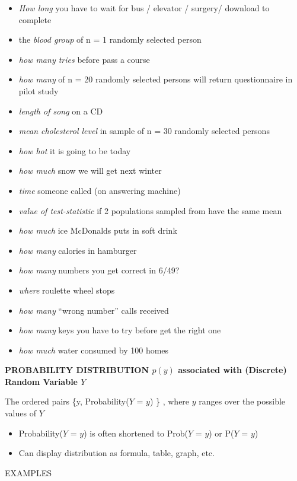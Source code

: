 \documentclass[]{book}
\providecommand{\tightlist}{%
  \setlength{\itemsep}{0pt}\setlength{\parskip}{0pt}}
\begin{document}
\begin{itemize}
\tightlist
\item
  \emph{How long} you have to wait for bus / elevator / surgery/ download to complete
\item
  the \emph{blood group} of n = 1 randomly selected person
\item
  \emph{how many tries} before pass a course
\item
  \emph{how many} of n = 20 randomly selected persons will return questionnaire in pilot study
\item
  \emph{length of song} on a CD
\item
  \emph{mean cholesterol level} in sample of n = 30 randomly selected persons
\item
  \emph{how hot} it is going to be today
\item
  \emph{how much} snow we will get next winter
\item
  \emph{time} someone called (on answering machine)
\item
  \emph{value of test-statistic} if 2 populations sampled from have the same mean
\item
  \emph{how much} ice McDonalds puts in soft drink
\item
  \emph{how many} calories in hamburger
\item
  \emph{how many} numbers you get correct in 6/49?
\item
  \emph{where} roulette wheel stops
\item
  \emph{how many} ``wrong number'' calls received
\item
  \emph{how many} keys you have to try before get the right one
\item
  \emph{how much} water consumed by 100 homes
\end{itemize}

\textbf{PROBABILITY DISTRIBUTION \(p(y)\) associated with (Discrete) Random Variable \(Y\)}

The ordered pairs \{y, Probability(\(Y\) = \(y\)) \} , where \(y\) ranges over the possible values of \(Y\)

\begin{itemize}
\item
  Probability(\(Y\) = \(y\)) is often shortened to Prob(\(Y\) = \(y\)) or P(\(Y\) = \(y\))
\item
  Can display distribution as formula, table, graph, etc.
\end{itemize}

EXAMPLES
\end{document}
